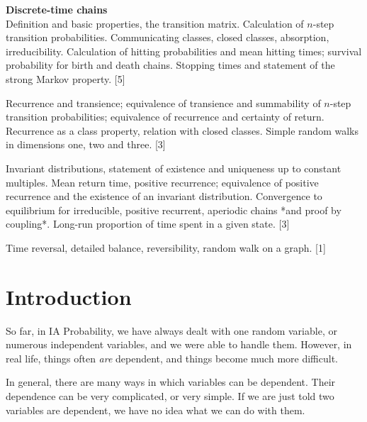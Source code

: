 \documentclass[a4paper]{article}
\begin{document}
\maketitle
{\small
\noindent\textbf{Discrete-time chains}\\
Definition and basic properties, the transition matrix. Calculation of $n$-step transition probabilities. Communicating classes, closed classes, absorption, irreducibility. Calculation of hitting probabilities and mean hitting times; survival probability for birth and death chains. Stopping times and statement of the strong Markov property.\hspace*{\fill} [5]

\vspace{5pt}
\noindent Recurrence and transience; equivalence of transience and summability of $n$-step transition probabilities; equivalence of recurrence and certainty of return. Recurrence as a class property, relation with closed classes. Simple random walks in dimensions one, two and three.\hspace*{\fill} [3]

\vspace{5pt}
\noindent Invariant distributions, statement of existence and uniqueness up to constant multiples. Mean return time, positive recurrence; equivalence of positive recurrence and the existence of an invariant distribution. Convergence to equilibrium for irreducible, positive recurrent, aperiodic chains *and proof by coupling*. Long-run proportion of time spent in a given state.\hspace*{\fill} [3]

\vspace{5pt}
\noindent Time reversal, detailed balance, reversibility, random walk on a graph.\hspace*{\fill} [1]}

\tableofcontents
\setcounter{section}{-1}
\section{Introduction}
So far, in IA Probability, we have always dealt with one random variable, or numerous independent variables, and we were able to handle them. However, in real life, things often \emph{are} dependent, and things become much more difficult.

In general, there are many ways in which variables can be dependent. Their dependence can be very complicated, or very simple. If we are just told two variables are dependent, we have no idea what we can do with them.
\end{document}
